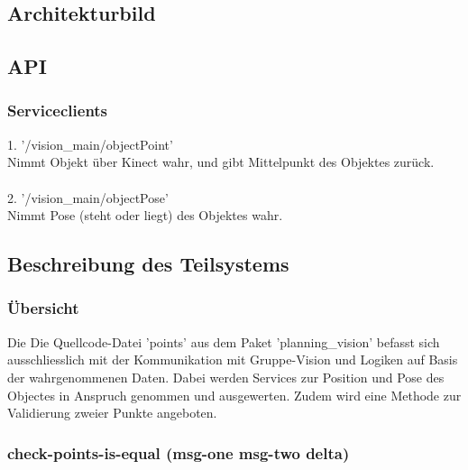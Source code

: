 \documentclass{suturo}
\begin{document}
\subsection{Architekturbild}



\begin{figure}[!htb]
\end{figure}


\subsection{API}
\subsubsection{Serviceclients}
1. '/vision\_main/objectPoint' \\
Nimmt Objekt über Kinect wahr, und gibt Mittelpunkt des Objektes zur\"uck.\\ \\
2. '/vision\_main/objectPose' \\
Nimmt Pose (steht oder liegt) des Objektes wahr.
\subsection{Beschreibung des Teilsystems}
\subsubsection{\"Ubersicht}
Die Die Quellcode-Datei 'points' aus dem Paket 'planning\_vision' befasst sich ausschliesslich mit der Kommunikation mit Gruppe-Vision und Logiken auf Basis der wahrgenommenen Daten. Dabei werden Services zur Position und Pose des Objectes in Anspruch genommen und ausgewerten. Zudem wird eine Methode zur Validierung zweier Punkte angeboten.
\subsubsection{check-points-is-equal (msg-one msg-two delta)}
\end{document}
